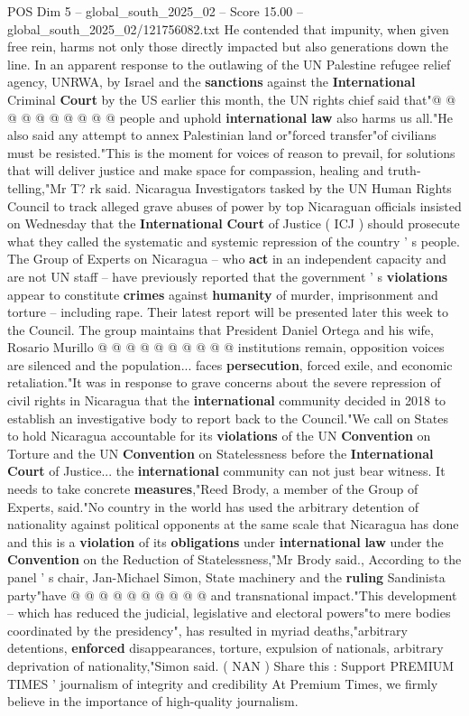 \begin{textsample}{POS Dim 5 – global\_south\_2025\_02 – Score 15.00 – global\_south\_2025\_02/121756082.txt}
He contended that impunity, when given free rein, harms not only those directly impacted but also generations down the line.
In an apparent response to the outlawing of the UN Palestine refugee relief agency, UNRWA, by Israel and the \textbf{sanctions} against the \textbf{International} Criminal \textbf{Court} by the US earlier this month, the UN rights chief said that"@ @ @ @ @ @ @ @ @ @ people and uphold \textbf{international} \textbf{law} also harms us all."He also said any attempt to annex Palestinian land or"forced transfer"of civilians must be resisted."This is the moment for voices of reason to prevail, for solutions that will deliver justice and make space for compassion, healing and truth-telling,"Mr T? rk said.
Nicaragua Investigators tasked by the UN Human Rights Council to track alleged grave abuses of power by top Nicaraguan officials insisted on Wednesday that the \textbf{International} \textbf{Court} of Justice ( ICJ ) should prosecute what they called the systematic and systemic repression of the country ' s people.
The Group of Experts on Nicaragua -- who \textbf{act} in an independent capacity and are not UN staff -- have previously reported that the government ' s \textbf{violations} appear to constitute \textbf{crimes} against \textbf{humanity} of murder, imprisonment and torture -- including rape.
Their latest report will be presented later this week to the Council.
The group maintains that President Daniel Ortega and his wife, Rosario Murillo @ @ @ @ @ @ @ @ @ @ institutions remain, opposition voices are silenced and the population... faces \textbf{persecution}, forced exile, and economic retaliation."It was in response to grave concerns about the severe repression of civil rights in Nicaragua that the \textbf{international} community decided in 2018 to establish an investigative body to report back to the Council."We call on States to hold Nicaragua accountable for its \textbf{violations} of the UN \textbf{Convention} on Torture and the UN \textbf{Convention} on Statelessness before the \textbf{International} \textbf{Court} of Justice... the \textbf{international} community can not just bear witness.
It needs to take concrete \textbf{measures},"Reed Brody, a member of the Group of Experts, said."No country in the world has used the arbitrary detention of nationality against political opponents at the same scale that Nicaragua has done and this is a \textbf{violation} of its \textbf{obligations} under \textbf{international} \textbf{law} under the \textbf{Convention} on the Reduction of Statelessness,"Mr Brody said., According to the panel ' s chair, Jan-Michael Simon, State machinery and the \textbf{ruling} Sandinista party"have @ @ @ @ @ @ @ @ @ @ and transnational impact."This development -- which has reduced the judicial, legislative and electoral powers"to mere bodies coordinated by the presidency", has resulted in myriad deaths,"arbitrary detentions, \textbf{enforced} disappearances, torture, expulsion of nationals, arbitrary deprivation of nationality,"Simon said. ( NAN ) Share this : Support PREMIUM TIMES ' journalism of integrity and credibility At Premium Times, we firmly believe in the importance of high-quality journalism.

\end{textsample}
